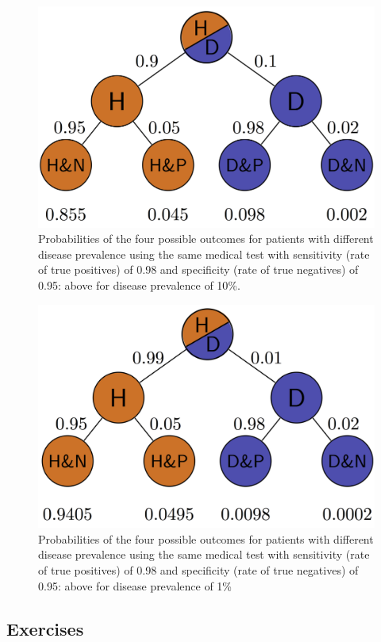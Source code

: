 \documentclass[
]{book}
\theoremstyle{definition}
\theoremstyle{definition}
\theoremstyle{definition}
\theoremstyle{remark}
\begin{document}
\begin{figure}
\centering
\includegraphics{ch7/prob_tree_tikz1.png}
\caption{Probabilities of the four possible outcomes for patients with different disease prevalence using the same medical test with sensitivity (rate of true positives) of 0.98 and specificity (rate of true negatives) of 0.95: above for disease prevalence of 10\%.}
\end{figure}

\begin{figure}
\centering
\includegraphics{ch7/prob_tree_tikz2.png}
\caption{Probabilities of the four possible outcomes for patients with different disease prevalence using the same medical test with sensitivity (rate of true positives) of 0.98 and specificity (rate of true negatives) of 0.95: above for disease prevalence of 1\%}
\end{figure}

\hypertarget{exercises-26}{%
\subsection{Exercises}\label{exercises-26}}
\end{document}

